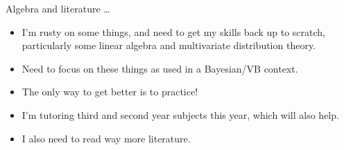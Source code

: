 \documentclass{beamer}
\begin{document}
\begin{frame}{Algebra and literature \ldots}

\begin{itemize}
\item I'm rusty on some things, and need to get my skills back up to scratch, particularly some linear 
algebra and multivariate distribution theory.
\item Need to focus on these things as used in a Bayesian/VB context.
\item The only way to get better is to practice!
\item I'm tutoring third and second year subjects this year, which will also help.
\item I also need to read way more literature.

\end{itemize}
\end{frame}
\end{document}
